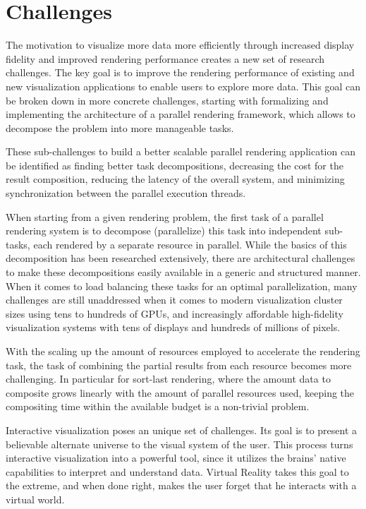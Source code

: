 \section{Challenges}

The motivation to visualize more data more efficiently through increased
display fidelity and improved rendering performance creates a new set of
research challenges. The key goal is to improve the rendering performance of
existing and new visualization applications to enable users to explore more
data. This goal can be broken down in more concrete challenges, starting with
formalizing and implementing the architecture of a parallel rendering
framework, which allows to decompose the problem into more manageable tasks.

These sub-challenges to build a better scalable parallel rendering application
can be identified as finding better task decompositions, decreasing the cost
for the result composition, reducing the latency of the overall system, and
minimizing synchronization between the parallel execution threads.

When starting from a given rendering problem, the first task of a parallel
rendering system is to decompose (parallelize) this task into independent
sub-tasks, each rendered by a separate resource in parallel. While the basics
of this decomposition has been researched extensively, there are architectural
challenges to make these decompositions easily available in a generic and
structured manner. When it comes to load balancing these tasks for an optimal
parallelization, many challenges are still unaddressed when it comes to modern
visualization cluster sizes using tens to hundreds of GPUs, and increasingly
affordable high-fidelity visualization systems with tens of displays and
hundreds of millions of pixels.

With the scaling up the amount of resources employed to accelerate the
rendering task, the task of combining the partial results from each resource
becomes more challenging. In particular for sort-last rendering, where the
amount data to composite grows linearly with the amount of parallel resources
used, keeping the compositing time within the available budget is a non-trivial
problem.

Interactive visualization poses an unique set of challenges. Its goal is to
present a believable alternate universe to the visual system of the user. This
process turns interactive visualization into a powerful tool, since it utilizes
the brains' native capabilities to interpret and understand data. Virtual
Reality takes this goal to the extreme, and when done right, makes the user
forget that he interacts with a virtual world.

